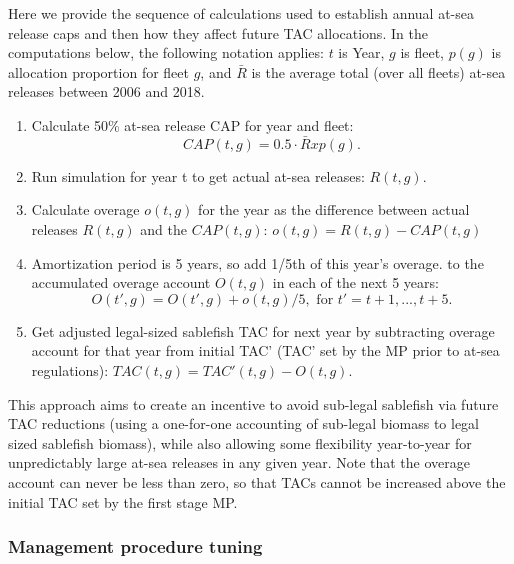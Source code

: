 \documentclass[11pt]{book}
\begin{document}
Here we provide the sequence of calculations used to establish annual at-sea release caps and then how they affect future TAC allocations. In the computations below, the following notation applies: \(t\) is Year, \(g\) is fleet, \(p(g)\) is allocation proportion for fleet \(g\), and \(\bar{R}\) is the average total (over all fleets) at-sea releases between 2006 and 2018.
\begin{enumerate}
\def\labelenumi{\arabic{enumi}.}

\item
  Calculate 50\% at-sea release CAP for year and fleet: \begin{equation*}
        CAP(t,g) = 0.5 \cdot \bar{R} x p(g).
  \end{equation*}
\item
  Run simulation for year t to get actual at-sea releases: \(R(t,g)\).
\item
  Calculate overage \(o(t,g)\) for the year as the difference between actual releases \(R(t,g)\) and the \(CAP(t,g)\): \(o(t,g) = R(t,g) - CAP(t,g)\)
\item
  Amortization period is 5 years, so add 1/5th of this year's overage. to the accumulated overage account \(O(t,g)\) in each of the next 5 years: \begin{equation*}
  O(t',g) = O(t',g) + o(t,g)/5, \mbox{ for } t' = t+1, ..., t+5.
  \end{equation*}
\item
  Get adjusted legal-sized sablefish TAC for next year by subtracting overage account for that year from initial TAC' (TAC' set by the MP prior to at-sea regulations): \(TAC(t,g) = TAC'(t,g) - O(t,g)\).
\end{enumerate}
This approach aims to create an incentive to avoid sub-legal sablefish via future TAC reductions (using a one-for-one accounting of sub-legal biomass to legal sized sablefish biomass), while also allowing some flexibility year-to-year for unpredictably large at-sea releases in any given year. Note that the overage account can never be less than zero, so that TACs cannot be increased above the initial TAC set by the first stage MP.

\hypertarget{management-procedure-tuning}{%
\subsubsection{Management procedure tuning}\label{management-procedure-tuning}}
\end{document}
